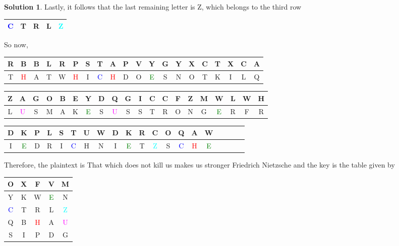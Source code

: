 \documentclass[11pt]{article}
\theoremstyle{definition}\newtheorem{definition}{Definition}
\theoremstyle{definition}\newtheorem{question}{Question}
\theoremstyle{definition}\newtheorem*{solution}{Solution}
\begin{document}
\begin{solution}
    Lastly, it follows that the last remaining letter is Z, which belongs to the third row
    \begin{center}
        \begin{tabular}{|c|c|c|c|c|} \hline
            \textcolor{blue}{C} & T & R & L & \textcolor{cyan}{Z} \\ \hline
        \end{tabular}
    \end{center}
    So now,
    \begin{center}
        \begin{tabular}{|cc|cc|cc|cc|cc|cc|cc|cc|cc|cc|} \hline
            R & B & B & L & R & P & S & T & A & P & V & Y & G & Y & X & C & T & X & C & A \\ \hline
            T & \textcolor{red}{H} & A & T & W & \textcolor{red}{H} & I & \textcolor{blue}{C} & \textcolor{red}{H} & D & O & \textcolor{green}{E} & S & N & O & T & K & I & L & Q \\ \hline
        \end{tabular}

        \begin{tabular}{|cc|cc|cc|cc|cc|cc|cc|cc|cc|cc|} \hline
            Z & A & G & O & B & E & Y & D & Q & G & I & C & C & F & Z & M & W & L & W & H \\ \hline
            L & \textcolor{magenta}{U} & S & M & A & K & \textcolor{green}{E} & S & \textcolor{magenta}{U} & S & S & T & R & O & N & G & \textcolor{green}{E} & R & F & R \\ \hline
        \end{tabular}

        \begin{tabular}{|cc|cc|cc|cc|cc|cc|cc|cc|cc|cc|} \hline
            D & K & P & L & S & T & U & W & D & K & R & C & O & Q & A & W \\ \hline
            I & \textcolor{green}{E} & D & R & I & \textcolor{blue}{C} & H & N & I & \textcolor{green}{E} & T & \textcolor{cyan}{Z} & S & \textcolor{blue}{C} & \textcolor{red}{H} & \textcolor{green}{E} \\ \hline
        \end{tabular}
    \end{center}

    Therefore, the plaintext is \textsf{That which does not kill us makes us stronger Friedrich Nietzsche} and the key is the table given by
    \begin{center}
        \begin{tabular}{|c|c|c|c|c|} \hline
            O & X & F & V & M \\ \hline
            Y & K & W & \textcolor{green}{E} & N \\ \hline
            \textcolor{blue}{C} & T & R & L & \textcolor{cyan}{Z} \\ \hline
            Q & B & \textcolor{red}{H} & A & \textcolor{magenta}{U} \\ \hline
            S & I & P & D & G \\ \hline
        \end{tabular}
    \end{center}
\end{solution}
\end{document}
